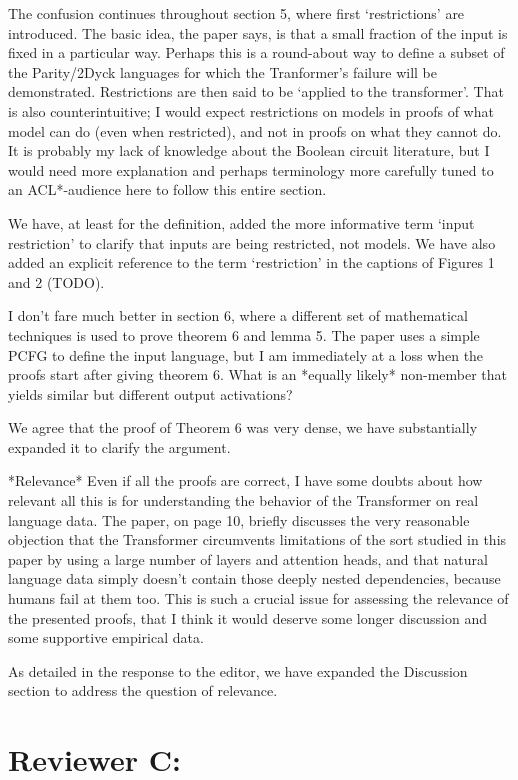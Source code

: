 \documentclass[11pt,a4paper]{article}
\newcounter{theorem}
\newcommand\response[1]{{\color{blue}#1}}
\begin{document}
The confusion continues throughout section 5, where first ‘restrictions’
are introduced. The basic idea, the paper says, is that a small fraction of
the input is fixed in a particular way. Perhaps this is a round-about way to
define a subset of the Parity/2Dyck languages for which the Tranformer’s
failure will be demonstrated. Restrictions are then said to be ‘applied to
the transformer’. That is also counterintuitive; I would expect
restrictions on models in proofs of what model can do (even when
restricted), and not in proofs on what they cannot do. It is probably my
lack of knowledge about the Boolean circuit literature, but I would need
more explanation and perhaps terminology more carefully tuned to an
ACL*-audience here to follow this entire section.

\response{We have, at least for the definition, added the more informative term `input restriction' to clarify that inputs are being restricted, not models. We have also added an explicit reference to the term `restriction' in the captions of Figures 1 and 2 (TODO).}

I don’t fare much better in section 6, where a different set of
mathematical techniques is used to prove theorem 6 and lemma 5. The paper
uses a simple PCFG to define the input language, but I am immediately at a
loss when the proofs start after giving theorem 6. What is an *equally
likely* non-member that yields similar but different output activations?

\response{We agree that the proof of Theorem 6 was very dense, we have substantially expanded it to clarify the argument.}

*Relevance*
Even if all the proofs are correct, I have some doubts about how relevant
all this is for understanding the behavior of the Transformer on real
language data. The paper, on page 10, briefly discusses the very reasonable
objection that the Transformer circumvents limitations of the sort studied
in this paper by using a large number of layers and attention heads, and
that natural language data simply doesn’t contain those deeply nested
dependencies, because humans fail at them too. This is such a crucial issue
for assessing the relevance of the presented proofs, that I think it would
deserve some longer discussion and some supportive empirical data.

\response{As detailed in the response to the editor, we have expanded the Discussion section to address the question of relevance.}


\section{Reviewer C:}
\end{document}
